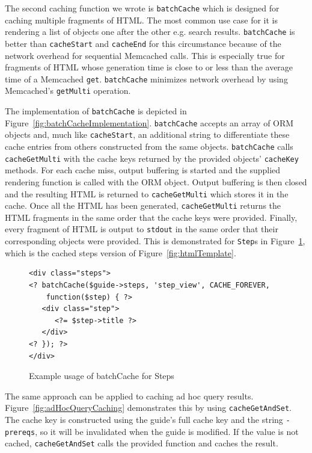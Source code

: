 \documentclass[12pt]{ucthesis}
\begin{document}
The second caching function we wrote is {\tt batchCache} which is designed for caching multiple fragments of HTML.
The most common use case for it is rendering a list of objects one after the other e.g. search results.
{\tt batchCache} is better than {\tt cacheStart} and {\tt cacheEnd} for this circumstance because of the network overhead for sequential \textsf{Memcached} calls.
This is especially true for fragments of HTML whose generation time is close to or less than the average time of a \textsf{Memcached} {\tt get}.
{\tt batchCache} minimizes network overhead by using \textsf{Memcached}'s {\tt getMulti} operation.

The implementation of {\tt batchCache} is depicted in Figure~\ref{fig:batchCacheImplementation}.
{\tt batchCache} accepts an array of ORM objects and, much like {\tt cacheStart}, an additional string to differentiate these cache entries from others constructed from the same objects.
{\tt batchCache} calls {\tt cacheGetMulti} with the cache keys returned by the provided objects' {\tt cacheKey} methods.
For each cache miss, output buffering is started and the supplied rendering function is called with the ORM object.
Output buffering is then closed and the resulting HTML is returned to {\tt cacheGetMulti} which stores it in the cache.
Once all the HTML has been generated, {\tt cacheGetMulti} returns the HTML fragments in the same order that the cache keys were provided.
Finally, every fragment of HTML is output to {\tt stdout} in the same order that their corresponding objects were provided.
This is demonstrated for {\tt Step}s in Figure~\ref{fig:batchCacheStep}, which is the cached steps version of Figure~\ref{fig:htmlTemplate}.

\begin{figure}[h]
\begin{ssp}
\begin{verbatim}
<div class="steps">
<? batchCache($guide->steps, 'step_view', CACHE_FOREVER,
    function($step) { ?>
   <div class="step">
      <?= $step->title ?>
   </div>
<? }); ?>
</div>
\end{verbatim}
\end{ssp}
\caption{Example usage of batchCache for Steps}
\label{fig:batchCacheStep}
\end{figure}

The same approach can be applied to caching ad hoc query results.
Figure~\ref{fig:adHocQueryCaching} demonstrates this by using {\tt cacheGetAndSet}.
The cache key is constructed using the guide's full cache key and the string {\tt -prereqs}, so it will be invalidated when the guide is modified.
If the value is not cached, {\tt cacheGetAndSet} calls the provided function and caches the result.
\end{document}
